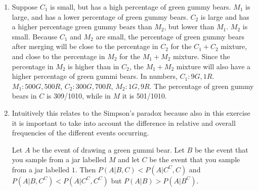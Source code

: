 

\setcounter{theorem}{56}
\begin{exercise}[BH.2.57]
\begin{solution}
    \begin{enumerate}
        \item Suppose $C_{1}$ is small, but has a high percentage of green gummy bears. $M_{1}$ is large, and has a lower percentage of green gummy bears. $C_{2}$ is large and has a higher percentage green gummy bears than $M_{2}$, but lower than $M_{1}$. $M_{2}$ is small. Because $C_{1}$ and $M_{2}$ are small, the percentage of green gummy bears after merging will be close to the percentage in $C_{2}$ for the $C_{1}+C_{2}$ mixture, and close to the percentage in $M_{2}$ for the $M_{1}+M_{2}$ mixture. Since the percentage in $M_{2}$ is higher than in $C_{2}$, the $M_{1}+M_{2}$ mixture will also have a higher percentage of green gummi bears. In numbers, $C_{1}: 9G,1R$. $M_{1}: 500G,500R$, $C_{2}: 300G,700R$, $M_{2}:1G,9R$. The percentage of green gummy bears in $C$ is 309/1010, while in $M$ it is 501/1010.
        \item Intuitively this relates to the Simpson's paradox because also in this exercise it is important to take into account the difference in relative and overall frequencies of the different events occurring.

        Let $A$ be the event of drawing a green gummi bear. Let $B$ be the event that you sample from a jar labelled $M$ and let $C$ be the event that you sample from a jar labelled $1$. Then $P(A|B,C)<P(A|C^C,C)$ and $P(A|B,C^C)<P(A|C^C,C^C)$ but $P(A|B)>P(A|B^C)$.
    \end{enumerate}
\end{solution}
\end{exercise}

